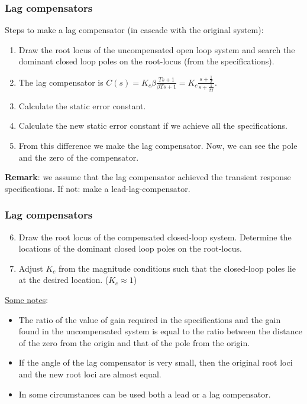 \begin{frame}
	\frametitle{Lag compensators}
		Steps to make a lag compensator (in cascade with the original system):
		\begin{enumerate}
			\item Draw the root locus of the uncompensated open loop system and search the dominant closed loop poles on the root-locus (from the specifications).
			\item The lag compensator is $C(s)=K_c \beta\frac{Ts+1}{\beta Ts+1}= K_c\frac{s+\frac{1}{T}}{s+\frac{1}{\beta T}}$.
			\item Calculate the static error constant. 
			\item Calculate the new static error constant if we achieve all the specifications.
			\item From this difference we make the lag compensator. Now, we can see the pole and the zero of the compensator. 
		\end{enumerate}
		\textbf{Remark}: we assume that the lag compensator achieved the transient response specifications. If not: make a lead-lag-compensator.
\end{frame}

\begin{frame}
	\frametitle{Lag compensators}
		\begin{enumerate}
			\setcounter{enumi}{5}
			\item Draw the root locus of the compensated closed-loop system. Determine the locations of the dominant closed loop poles on the root-locus. 
			\item Adjust $K_c$ from the magnitude conditions such that the closed-loop poles lie at the desired location. ($K_c\approx 1$)
		\end{enumerate}
		\vspace{3mm}
		
		\underline{Some notes}:
		\begin{itemize}
			\item The ratio of the value of gain required in the specifications and the gain found in the uncompensated system is equal to the ratio between the distance of the zero from the origin and that of the pole from the origin.
			\item If the angle of the lag compensator is very small, then the original root loci and the new root loci are almost equal.
			\item In some circumstances can be used both a lead or a lag compensator. 
		\end{itemize}
\end{frame}

